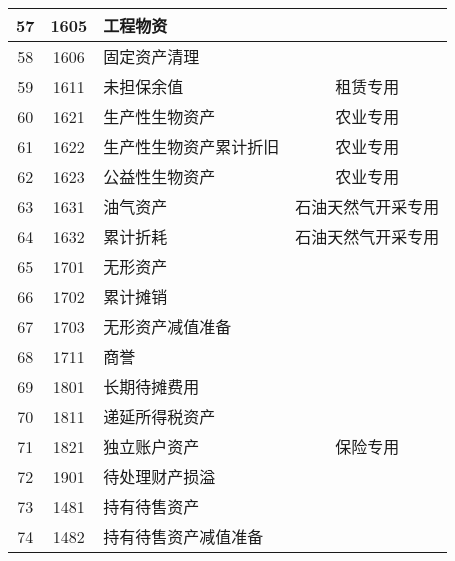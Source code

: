 \documentclass[a4paper]{ctexart}    %
\begin{document}
\begin{center}
\begin{longtable}{|c|c|p{6cm}|c|}
57 & 1605 & 工程物资 & \\\hline
58 & 1606 & 固定资产清理 & \\\hline
59 & 1611 & 未担保余值 & 租赁专用 \\\hline
60 & 1621 & 生产性生物资产 & 农业专用 \\\hline
61 & 1622 & 生产性生物资产累计折旧 & 农业专用 \\\hline
62 & 1623 & 公益性生物资产 & 农业专用 \\\hline
63 & 1631 & 油气资产 & 石油天然气开采专用 \\\hline
64 & 1632 & 累计折耗 & 石油天然气开采专用 \\\hline
65 & 1701 & 无形资产 & \\\hline
66 & 1702 & 累计摊销 & \\\hline
67 & 1703 & 无形资产减值准备 & \\\hline
68 & 1711 & 商誉 & \\\hline
69 & 1801 & 长期待摊费用 & \\\hline
70 & 1811 & 递延所得税资产 & \\\hline
71 & 1821 & 独立账户资产 & 保险专用 \\\hline
72 & 1901 & 待处理财产损溢 & \\\hline
73 & 1481 & 持有待售资产 & \\\hline
74 & 1482 & 持有待售资产减值准备 & \\
\end{longtable}
\end{center}
\end{document}

